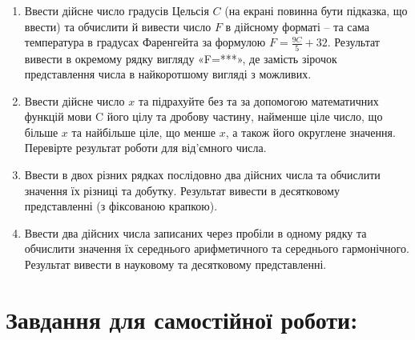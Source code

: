 \documentclass[a5paper,titlepage,openany,twoside,
]
{book_unv}%
\begin{document}
\begin{enumerate}
\item
Ввести дійсне число градусів Цельсія $C$ (на екрані повинна бути
підказка, що ввести) та обчислити й вивести число $F$ в дійсному форматі
-- та сама температура в градусах Фаренгейта за формулою $F = \frac{9C}{5} + 32 $.
Результат вивести в окремому рядку вигляду «F=***», де замість зірочок представлення числа в найкоротшому вигляді
з можливих.

\item
Ввести дійсне число $x$ та підрахуйте без та за допомогою математичних
функцій мови C його цілу та дробову частину, найменше ціле число, що більше
$x$ та найбільше ціле, що менше $x$, а також його округлене значення.
Перевірте результат роботи для від'ємного числа.
\item
Ввести в двох різних рядках послідовно два дійсних числа та обчислити
значення їх різниці та добутку. Результат вивести в десятковому
представленні (з фіксованою крапкою).
\item
Ввести два дійсних числа записаних через пробіли в одному рядку та
обчислити значення їх середнього арифметичного та середнього
гармонічного. Результат вивести в науковому та десятковому
представленні.
\end{enumerate}

\section{Завдання для самостійної роботи:}
\end{document}
